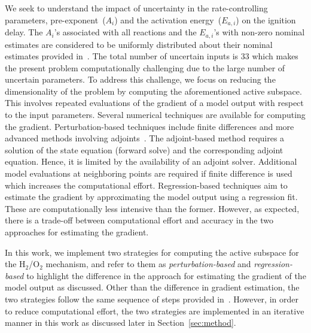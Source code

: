 We seek to understand the impact of uncertainty in the
rate-controlling parameters, pre-exponent~($A_i$) and the activation
energy~($E_{a,i}$) on the ignition delay. The $A_i$'s associated with all
reactions and the $E_{a,i}$'s with non-zero nominal estimates
are considered to be uniformly distributed about their nominal estimates provided
in~\cite{Yetter:1991}.  The total number of uncertain inputs is 33 which makes
the present problem computationally challenging due to the large number of 
uncertain parameters.  
To address this challenge, we focus on reducing the dimensionality
of the problem by computing the aforementioned active subspace.
This involves repeated evaluations of the gradient of a model output with
respect to the input parameters. Several numerical techniques are available
for computing the gradient. Perturbation-based techniques
include finite differences and more advanced methods involving
adjoints~\cite{Jameson:1988,Gunzburger:2003,Borzi:2011,Alexanderian:2017}. The
adjoint-based method requires a solution of the state equation (forward solve)
and the corresponding adjoint equation. Hence, it is 
limited by the availability of an adjoint solver. Additional model evaluations
at neighboring points are required if finite difference is used which increases
the computational effort. Regression-based techniques aim to estimate the
gradient by approximating the model output using a regression fit. These
are computationally less intensive than the former. However, as expected,
there is a trade-off between computational effort and accuracy in the two
approaches for estimating the gradient. 

In this work, we implement two strategies for computing the active subspace for the
H$_2$/O$_2$ mechanism, and refer to them as \textit{perturbation-based} and 
\textit{regression-based} to highlight the difference in the approach for estimating
the gradient of the model output as discussed.  
Other than the difference in gradient estimation, the two strategies follow the same
sequence of steps provided in~\cite{Constantine:2015}. However, 
in order to reduce computational effort, the two strategies are implemented in an
iterative manner in this work as discussed later in Section~\ref{sec:method}.

